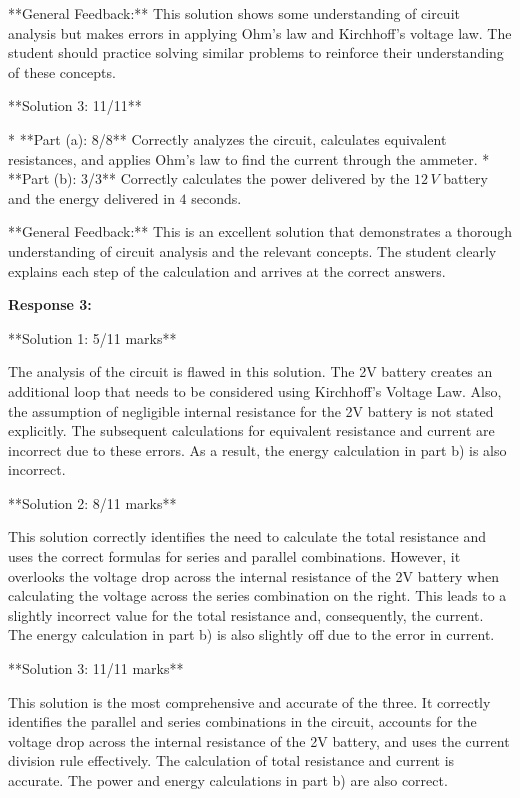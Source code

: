 \documentclass[a4paper,11pt]{article}
\begin{document}
**General Feedback:** This solution shows some understanding of circuit analysis but makes errors in applying Ohm's law and Kirchhoff's voltage law. The student should practice solving similar problems to reinforce their understanding of these concepts.

**Solution 3: 11/11**

*   **Part (a): 8/8** Correctly analyzes the circuit, calculates equivalent resistances, and applies Ohm's law to find the current through the ammeter.
*   **Part (b): 3/3** Correctly calculates the power delivered by the \(12\,V\) battery and the energy delivered in \(4\) seconds.

**General Feedback:** This is an excellent solution that demonstrates a thorough understanding of circuit analysis and the relevant concepts. The student clearly explains each step of the calculation and arrives at the correct answers.


\textbf{Response 3:}

**Solution 1: 5/11 marks**

The analysis of the circuit is flawed in this solution. The 2V battery creates an additional loop that needs to be considered using Kirchhoff's Voltage Law. Also, the assumption of negligible internal resistance for the 2V battery is not stated explicitly. The subsequent calculations for equivalent resistance and current are incorrect due to these errors. As a result, the energy calculation in part b) is also incorrect.

**Solution 2: 8/11 marks**

This solution correctly identifies the need to calculate the total resistance and uses the correct formulas for series and parallel combinations. However, it overlooks the voltage drop across the internal resistance of the 2V battery when calculating the voltage across the series combination on the right. This leads to a slightly incorrect value for the total resistance and, consequently, the current. The energy calculation in part b) is also slightly off due to the error in current.

**Solution 3: 11/11 marks**

This solution is the most comprehensive and accurate of the three. It correctly identifies the parallel and series combinations in the circuit, accounts for the voltage drop across the internal resistance of the 2V battery, and uses the current division rule effectively. The calculation of total resistance and current is accurate. The power and energy calculations in part b) are also correct.
\end{document}
